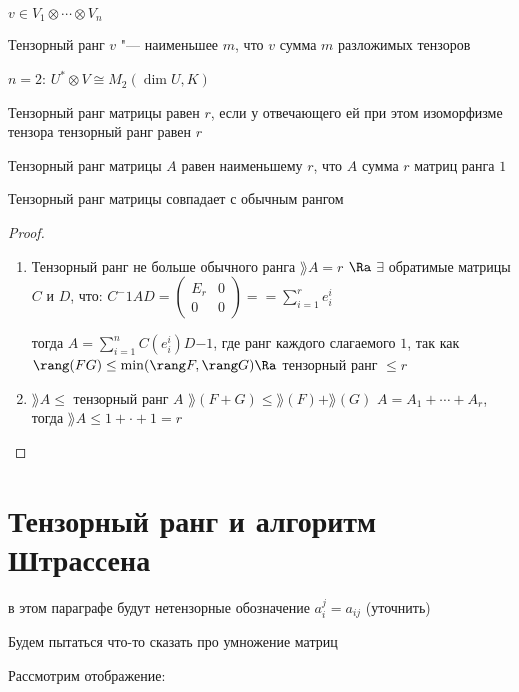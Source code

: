 \begin{Def}
    $v \in V_1 \otimes \cdots \otimes V_n$

    Тензорный ранг $v$ "--- наименьшее $m$, что $v$ сумма $m$ разложимых тензоров
\end{Def}

$n = 2$: $U^* \otimes V \cong M_2(\dim U, K)$

\begin{Def}
Тензорный ранг матрицы равен $r$, если у отвечающего ей при этом изоморфизме тензора тензорный ранг равен $r$

Тензорный ранг матрицы $A$ равен наименьшему $r$, что $A$ сумма $r$ матриц ранга $1$
\end{Def}
\begin{theorem}
    Тензорный ранг матрицы совпадает с обычным рангом
\end{theorem}

\begin{proof}
    \begin{enumerate}
        \item Тензорный ранг не больше обычного ранга
            $\rang A = r$ $\Ra$ $\exists$ обратимые матрицы $C$ и $D$, что:
            $C^-1AD = 
            \begin{pmatrix}
                 E_r & 0 \\
                 0 & 0 
            \end{pmatrix} == \sum_{i = 1}^r e_i^i$

            тогда $A = \sum_{i=1}^n C(e_i^i)D{-1}$, где ранг каждого слагаемого $1$, так как
             $\rang (F G) \leq \min (\rang F, \rang G) \Ra$ тензорный ранг $\leq r$

        \item $\rang A \leq $ тензорный ранг $A$
            $\rang(F + G) \leq \rang(F) + \rang(G)$
            $A = A_1 + \cdots + A_r$, тогда $\rang A \leq 1 + \cdot + 1 = r$
    \end{enumerate}
\end{proof}

\section{Тензорный ранг и алгоритм Штрассена}

в этом параграфе будут нетензорные обозначение $a_i^j = a_{ij}$ (уточнить)

Будем пытаться что-то сказать про умножение матриц

Рассмотрим отображение:

